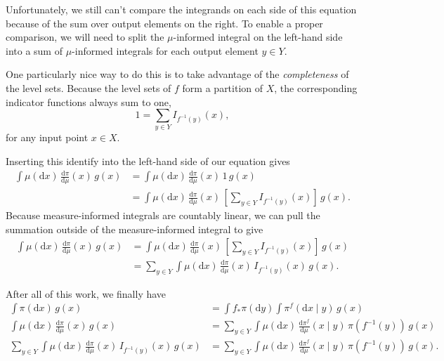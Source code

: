 \documentclass[
  letterpaper,
  DIV=11,
  numbers=noendperiod]{scrartcl}
\begin{document}
Unfortunately, we still can't compare the integrands on each side of
this equation because of the sum over output elements on the right. To
enable a proper comparison, we will need to split the \(\mu\)-informed
integral on the left-hand side into a sum of \(\mu\)-informed integrals
for each output element \(y \in Y\).

One particularly nice way to do this is to take advantage of the
\emph{completeness} of the level sets. Because the level sets of \(f\)
form a partition of \(X\), the corresponding indicator functions always
sum to one, \[
1 = \sum_{y \in Y} I_{f^{-1}(y)}(x),
\] for any input point \(x \in X\).

Inserting this identify into the left-hand side of our equation gives
\begin{align*}
\int \mu( \mathrm{d} x ) \, \frac{ \mathrm{d}  \pi }{ \mathrm{d}  \mu  }(x) \, g(x)
&=
\int \mu( \mathrm{d} x ) \, \frac{ \mathrm{d}  \pi }{ \mathrm{d}  \mu  }(x) \, 1 \, g(x)
\\
&=
\int \mu( \mathrm{d} x ) \, \frac{ \mathrm{d}  \pi }{ \mathrm{d}  \mu  }(x) \,
\left[ \sum_{y \in Y} I_{f^{-1}(y)}(x) \right] \, g(x).
\end{align*} Because measure-informed integrals are countably linear, we
can pull the summation outside of the measure-informed integral to give
\begin{align*}
\int \mu( \mathrm{d} x ) \, \frac{ \mathrm{d}  \pi }{ \mathrm{d}  \mu  }(x) \, g(x)
&=
\int \mu( \mathrm{d} x ) \, \frac{ \mathrm{d}  \pi }{ \mathrm{d}  \mu  }(x) \,
\left[ \sum_{y \in Y} I_{f^{-1}(y)}(x) \right] \, g(x)
\\
&=
\sum_{y \in Y} \int \mu( \mathrm{d} x ) \,
\frac{ \mathrm{d}  \pi }{ \mathrm{d}  \mu  }(x) \,
I_{f^{-1}(y)}(x) \, g(x).
\end{align*}

After all of this work, we finally have \begin{align*}
\int \pi( \mathrm{d} x ) \, g(x)
&=
\int f_{*} \pi (\mathrm{d} y)
\int \pi^{f}( \mathrm{d} x \mid y ) \, g(x)
\\
\int \mu( \mathrm{d} x ) \, \frac{ \mathrm{d}  \pi }{ \mathrm{d}  \mu  }(x) \, g(x)
&=
\sum_{y \in Y} \int \mu( \mathrm{d} x) \,
\frac{ \mathrm{d}  \pi^{f} }{ \mathrm{d}  \mu  }( x \mid y ) \,
\pi ( f^{-1}(y) ) \, g(x)
\\
\sum_{y \in Y} \int \mu( \mathrm{d} x ) \,
\frac{ \mathrm{d}  \pi }{ \mathrm{d}  \mu  }(x) \,
I_{f^{-1}(y)}(x) \, g(x)
&=
\sum_{y \in Y} \int \mu( \mathrm{d} x) \,
\frac{ \mathrm{d}  \pi^{f} }{ \mathrm{d}  \mu  }( x \mid y ) \,
\pi ( f^{-1}(y) ) \, g(x).
\end{align*}
\end{document}
